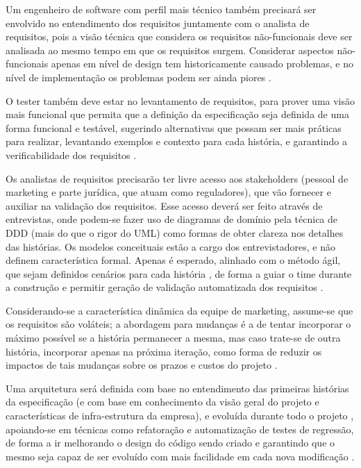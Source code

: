 \documentclass[12pt,journal,compsoc]{IEEEtran}
\begin{document}
Um engenheiro de software com perfil mais técnico também precisará ser envolvido no entendimento dos requisitos juntamente com o analista de requisitos, pois a visão técnica que considera os requisitos não-funcionais deve ser analisada ao mesmo tempo em que os requisitos surgem. Considerar aspectos não-funcionais apenas em nível de design tem historicamente causado problemas, e no nível de implementação os problemas podem ser ainda piores \cite{agile_requirements_definition}.

O tester também deve estar no levantamento de requisitos, para prover uma visão mais funcional que permita que a definição da especificação seja definida de uma forma funcional e testável, sugerindo alternativas que possam ser mais práticas para realizar, levantando exemplos e contexto para cada história, e garantindo a verificabilidade dos requisitos \cite{society_software_2004}. %

Os analistas de requisitos precisarão ter livre acesso aos stakeholders (pessoal de marketing e parte jurídica, que atuam como reguladores), que vão fornecer e auxiliar na validação dos requisitos. Esse acesso deverá ser feito através de entrevistas, onde podem-se fazer uso de diagramas de domínio pela técnica de DDD \cite{evans_domain-driven_2004} (mais do que o rigor do UML) como formas de obter clareza nos detalhes das histórias. Os modelos conceituais estão a cargo dos entrevistadores, e não definem característica formal. Apenas é esperado, alinhado com o método ágil, que sejam definidos cenários para cada história \cite{washington2003using}, de forma a guiar o time durante a construção e permitir geração de validação automatizada dos requisitos \cite{melnik_multiple_2007}.

Considerando-se a característica dinâmica da equipe de marketing, assume-se que os requisitos são voláteis; a abordagem para mudanças é a de tentar incorporar o máximo possível se a história permanecer a mesma, mas caso trate-se de outra história, incorporar apenas na próxima iteração, como forma de reduzir os impactos de tais mudanças sobre os prazos e custos do projeto \cite{zowghi2002study}.

Uma arquitetura será definida com base no entendimento das primeiras histórias da especificação (e com base em conhecimento da visão geral do projeto e características de infra-estrutura da empresa), e evoluída durante todo o projeto \cite{cohn_agile_2009}, apoiando-se em técnicas como refatoração e automatização de testes de regressão, de forma a ir melhorando o design do código sendo criado e garantindo que o mesmo seja capaz de ser evoluído com mais facilidade em cada nova modificação \cite{arora_chauhan_2014}.
\end{document}
